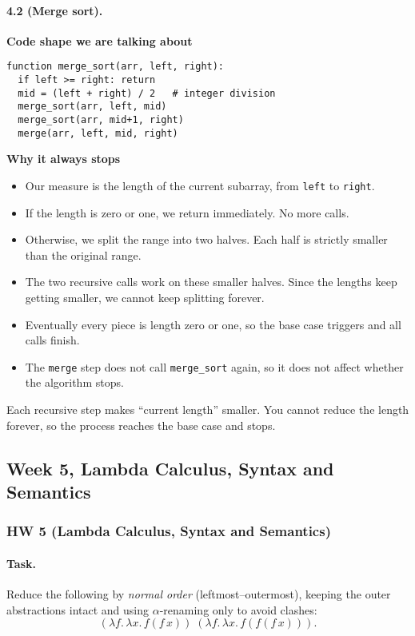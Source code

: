 \documentclass{article}
\theoremstyle{theorem}
\theoremstyle{definition}
\theoremstyle{remark}
\begin{document}
\paragraph{4.2 (Merge sort).}
\textbf{Code shape we are talking about}
\begin{verbatim}
function merge_sort(arr, left, right):
  if left >= right: return
  mid = (left + right) / 2   # integer division
  merge_sort(arr, left, mid)
  merge_sort(arr, mid+1, right)
  merge(arr, left, mid, right)
\end{verbatim}

\textbf{Why it always stops}
\begin{itemize}
  \item Our measure is the length of the current subarray, from \texttt{left} to \texttt{right}.
  \item If the length is zero or one, we return immediately. No more calls.
  \item Otherwise, we split the range into two halves. Each half is strictly smaller than the original range.
  \item The two recursive calls work on these smaller halves. Since the lengths keep getting smaller, we cannot keep splitting forever.
  \item Eventually every piece is length zero or one, so the base case triggers and all calls finish.
  \item The \texttt{merge} step does not call \texttt{merge\_sort} again, so it does not affect whether the algorithm stops.
\end{itemize}
 Each recursive step makes ``current length'' smaller. You cannot reduce the length forever, so the process reaches the base case and stops.

\subsection{Week 5, Lambda Calculus, Syntax and Semantics}
\subsubsection*{HW 5 (Lambda Calculus, Syntax and Semantics) \cite{kurz-hw5}}

\paragraph{Task.}
Reduce the following by \emph{normal order} (leftmost--outermost), keeping the outer abstractions intact and using $\alpha$-renaming only to avoid clashes:
\[
(\lambda f.\,\lambda x.\,f(f\,x))\;
(\lambda f.\,\lambda x.\,f(f(f\,x))).
\]
\end{document}
